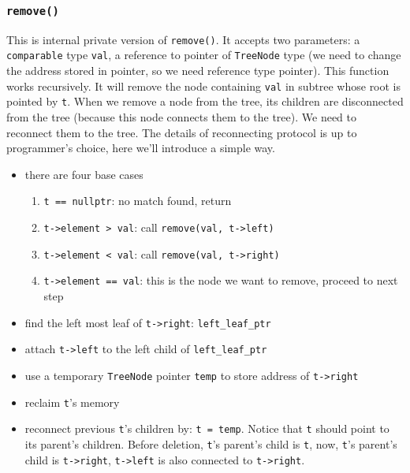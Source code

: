 \documentclass[12pt]{book}
\begin{document}
\subsubsection{\texttt{remove()}}
\label{sec:orgcba29f4}
This is internal private version of \texttt{remove()}. It accepts two parameters: a \texttt{comparable} type \texttt{val}, a reference to pointer of \texttt{TreeNode} type (we need to change the address stored in pointer, so we need reference type pointer). This function works recursively. It will remove the node containing \texttt{val} in subtree whose root is pointed by \texttt{t}. When we remove a node from the tree, its children are disconnected from the tree (because this node connects them to the tree). We need to reconnect them to the tree. The details of reconnecting protocol is up to programmer's choice, here we'll introduce a simple way.
\begin{itemize}
\item there are four base cases
\begin{enumerate}
\item \texttt{t == nullptr}: no match found, return
\item \texttt{t->element > val}: call \texttt{remove(val, t->left)}
\item \texttt{t->element < val}: call \texttt{remove(val, t->right)}
\item \texttt{t->element == val}: this is the node we want to remove, proceed to next step
\end{enumerate}
\item find the left most leaf of \texttt{t->right}: \texttt{left\_leaf\_ptr}
\item attach \texttt{t->left} to the left child of \texttt{left\_leaf\_ptr}
\item use a temporary \texttt{TreeNode} pointer \texttt{temp}  to store address of \texttt{t->right}
\item reclaim \texttt{t}'s memory
\item reconnect previous \texttt{t}'s children by: \texttt{t = temp}. Notice that \texttt{t} should point to its parent's children. Before deletion, \texttt{t}'s parent's child is \texttt{t}, now, \texttt{t}'s parent's child is \texttt{t->right}, \texttt{t->left} is also connected to \texttt{t->right}.
\end{itemize}
\end{document}
